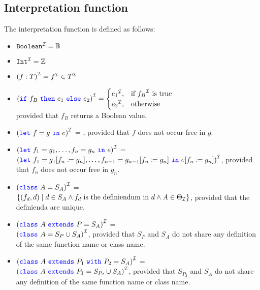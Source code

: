 \subsection{Interpretation function}

The interpretation function is defined as follows:
\begin{itemize}
    \item ${\texttt{{Boolean}}}^{\mathcal{I}} = \mathbb{B}$
    \item ${\texttt{{Int}}}^{\mathcal{I}} = \mathbb{Z}$

    \item ${(f : T)}^{\mathcal{I}} = {f}^{\mathcal{I}} \in {T}^{\mathcal{I}}$

    \item $\I{(\sif\ f_{B} \ \sthen\ e_{1} \ \selse\ e_{2})} =
    \begin{cases}
        \I{e_{1}}, & \text{if } \I{f_{B}} \text{ is true }\\
        \I{e_{2}}, & \text{otherwise}
    \end{cases}
    $\\
    provided that $f_{B}$ returns a Boolean value.

    \item ${({\color{blue}\texttt{{let}}}\ f = g \ {\color{blue}\texttt{{in}}}\ e)}^{\mathcal{I}}$ =
    , provided that $f$ does not occur free in $g$.

    \item ${({\color{blue}\texttt{{let}}}\ f_{1} = g_{1}, \ldots , f_{n} = g_{n} \ {\color{blue}\texttt{{in}}}\ e)}^{\mathcal{I}}$ = \\
    $\I{(\slet\ f_{1} = g_{1}[f_{n} \coloneqq g_{n}], \ldots , f_{n - 1} = g_{n - 1}[f_{n} \coloneqq g_{n}] \ \sdin\ e[f_{n} \coloneqq g_{n}])}$, provided that $f_{n}$ does not occur free in $g_{n}$.

    \item ${({\color{blue}\texttt{{class}}}\ A = S_{A})}^{\mathcal{I}}$ = \\
    $\{ (f_{d}, d) \mid d \in S_{A} \land f_{d} \text{ is the definiendum in } d \land A \in \Theta _{\mathcal{I}} \}$, provided that the definienda are unique.

    \item ${({\color{blue}\texttt{{class}}}\ A \ {\color{blue}\texttt{{extends}}}\ P = S_{A})}^{\mathcal{I}}$ = \\
    ${({\color{blue}\texttt{{class}}}\ A = S_{P} \cup S_{A})}^{\mathcal{I}}$, provided that $S_{P}$ and $S_{A}$ do not share any definition of the same function name or class name.

    \item $\I{(\sclass\ A \ \sextends\ P_{1} \ \swith\ P_{2} = S_{A})}$ = \\
    ${({\color{blue}\texttt{{class}}}\ A \ {\color{blue}\texttt{{extends}}}\ P_{1} = S_{P_{2}} \cup S_{A})}^{\mathcal{I}}$, provided that $S_{P_{2}}$ and $S_{A}$ do not share any definition of the same function name or class name.

\end{itemize}

